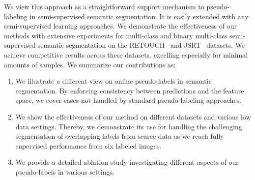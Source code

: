 \documentclass[letterpaper]{article} %
\begin{document}
We view this approach as a straightforward support mechanism to pseudo-labeling in semi-supervised semantic segmentation.
It is easily extended with any semi-supervised learning approaches.
We demonstrate the effectiveness of our methods with extensive experiments for multi-class and binary multi-class semi-supervised semantic segmentation on the RETOUCH~\cite{retouch} and JSRT~\cite{jsrt} datasets.
We achieve competitive results across these datasets, excelling especially for minimal amounts of samples. 
We summarize our contributions as:
\begin{enumerate}
    \item We illustrate a different view on online pseudo-labels in semantic segmentation. By enforcing consistency between predictions and the feature space, we cover cases not handled by standard pseudo-labeling approaches. %
    \item We show the effectiveness of our method on different datasets and various low data settings. Thereby, we demonstrate its use for handling the challenging segmentation of overlapping labels from scarce data as we reach fully supervised performance from six labeled images.
    \item We provide a detailed ablation study investigating different aspects of our pseudo-labels in various settings. 
\end{enumerate}
\end{document}
